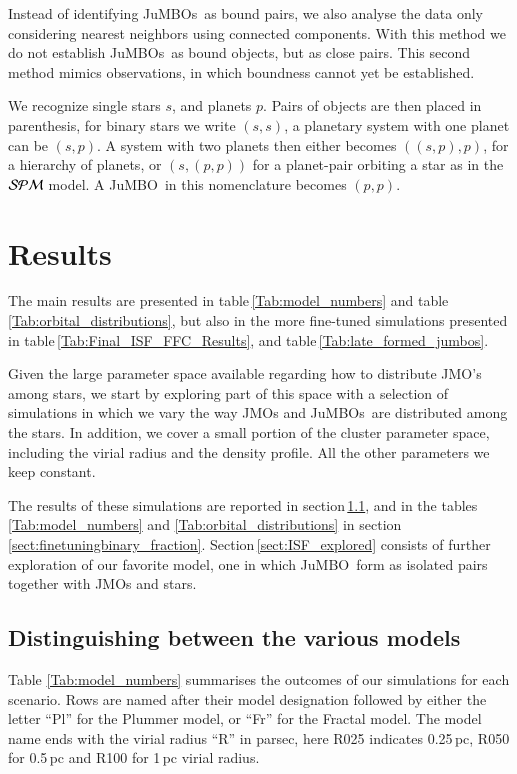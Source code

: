 \documentclass[submission,phys]{lib/SciPost}
\newcommand{\jumbo}{\mbox{JuMBO}}
\newcommand{\jumbos}{\mbox{JuMBOs}}
\begin{document}
Instead of identifying \jumbos\, as bound pairs, we also analyse the
data only considering nearest neighbors using connected components. With
this method we do not establish \jumbos\, as bound objects, but as
close pairs. This second method mimics observations, in which
boundness cannot yet be established.

We recognize single stars $s$, and planets $p$. Pairs of
objects are then placed in parenthesis, for binary stars we write
$(s,s)$, a planetary system with one planet can be $(s,p)$.  A system
with two planets then either becomes $((s,p),p)$, for a hierarchy of
planets, or $(s,(p,p))$ for a planet-pair orbiting a star as in the
${\cal SPM}$ model. A \jumbo\, in this nomenclature becomes $(p,p)$.

\section{Results}\label{Sect:Results}

The main results are presented in table\,\ref{Tab:model_numbers} and
table\,\ref{Tab:orbital_distributions}, but also in the more
fine-tuned simulations presented in
table\,\ref{Tab:Final_ISF_FFC_Results}, and
table\,\ref{Tab:late_formed_jumbos}.

Given the large parameter space available regarding how to distribute JMO’s
among stars, we start by exploring part of this space with a selection of 
simulations in which we vary the way JMOs and \jumbos\, are distributed among 
the stars. In addition, we cover a small portion of the cluster parameter
space, including the virial radius and the density profile. All the
other parameters we keep constant.

The results of these simulations are reported in
section\,\ref{sect:model_selection}, and in the
tables\,\ref{Tab:model_numbers} and \ref{Tab:orbital_distributions} in
section\,\ref{sect:finetuningbinary_fraction}. Section\,\ref{sect:ISF_explored}
consists of further exploration of our favorite model, one in which
\jumbo\, form as isolated pairs together with JMOs and stars.

\subsection{Distinguishing between the various models}\label{sect:model_selection}


Table \ref{Tab:model_numbers} summarises the outcomes of our simulations for each scenario.  Rows are named after
their model designation followed by either the letter ``Pl'' for the
Plummer model, or ``Fr'' for the Fractal model.  The model name ends
with the virial radius ``R'' in parsec, here R025 indicates 0.25\,pc,
R050 for 0.5\,pc and R100 for 1\,pc virial radius.
\end{document}
